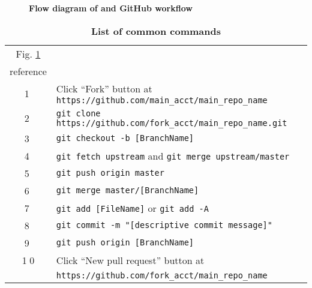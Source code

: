   \begin{figure}[htbp]\centering\captionsetup{width=6.0in}
    \caption{\textbf{Flow diagram of \git and GitHub workflow}}\label{FigGitFlowDiag}
  \end{figure}

  \begin{table}[htbp] \centering \captionsetup{width=6.0in}
  \caption{\label{TabGitCommands}\textbf{List of common \git commands}}
    \begin{threeparttable}
    \begin{tabular}{>{\small}c |>{\small}l}
      \hline\hline
      Fig. \ref{FigGitFlowDiag} & \\
      reference & \multicolumn{1}{c}{\small{\git command}} \\
      \hline
      \textcircled{1} & Click ``Fork'' button at \texttt{https://github.com/main\_acct/main\_repo\_name} \\[3mm]
      \textcircled{2} & \texttt{git clone https://github.com/fork\_acct/main\_repo\_name.git} \\[2mm]
      \textcircled{3} & \texttt{git checkout -b [BranchName]} \\[2mm]
      \textcircled{4} & \texttt{git fetch upstream}\hspace{5mm} and\hspace{5mm} \texttt{git merge upstream/master} \\[2mm]
      \textcircled{5} & \texttt{git push origin master} \\[2mm]
      \textcircled{6} & \texttt{git merge master/[BranchName]} \\[2mm]
      \textcircled{7} & \texttt{git add [FileName]} \hspace{5mm} or \hspace{5mm} \texttt{git add -A} \\[2mm]
      \textcircled{8} & \texttt{git commit -m "[descriptive commit message]"} \\[2mm]
      \textcircled{9} & \texttt{git push origin [BranchName]} \\[2mm]
      \textcircled{10} & Click ``New pull request'' button at \\
      &\qquad \texttt{https://github.com/fork\_acct/main\_repo\_name} \\
      \hline\hline
    \end{tabular}
    \end{threeparttable}
  \end{table}

